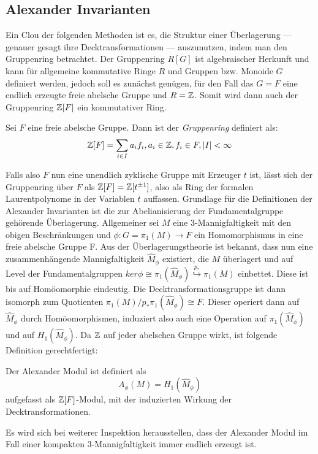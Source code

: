     \subsection{Alexander Invarianten}
    	Ein Clou der folgenden Methoden ist es, die Struktur einer Überlagerung --- genauer gesagt ihre Decktransformationen --- auszunutzen, indem man den Gruppenring betrachtet. Der Gruppenring $R[G]$ ist algebraischer Herkunft und kann für allgemeine kommutative Ringe $R$ und Gruppen bzw. Monoide $G$ definiert werden, jedoch soll es zunächst genügen, für den Fall das $G=F$ eine endlich erzeugte freie abelsche Gruppe und $R=\mathbb{Z}$. Somit wird dann auch der Gruppenring $\mathbb{Z}[F]$ ein kommutativer Ring.
    	\begin{defn}[Gruppenring]
    		Sei $F$ eine freie abelsche Gruppe. Dann ist der \textit{Gruppenring} definiert als:
    		\[
    			\mathbb{Z}[F] = \sum_{i \in I} a_i f_i, a_i \in \mathbb{Z}, f_i \in F, |I| < \infty
    		\]
    	\end{defn}
        \label{wirkung:gruppenring}
    	Falls also $F$ nun eine unendlich zyklische Gruppe mit Erzeuger $t$ ist, lässt sich der Gruppenring über $F$ als $\mathbb{Z}[F] = \mathbb{Z}[t^{\pm 1}]$, also als Ring der formalen Laurentpolynome in der Variablen $t$ auffassen. 
    	Grundlage für die Definitionen der Alexander Invarianten ist die zur Abelianisierung der Fundamentalgruppe gehörende Überlagerung. Allgemeiner sei $M$ eine 3-Mannigfaltigkeit mit den obigen Beschränkungen und $\phi: G=\pi_1(M) \to F$ ein Homomorphismus in eine freie abelsche Gruppe F. Aus der Überlagerungstheorie ist bekannt, dass nun eine zusammenhängende Mannigfaltigkeit $\hat M_\phi$ existiert, die $M$ überlagert und auf Level der Fundamentalgruppen $ker \phi \cong \pi_1 (\hat M_\phi) \stackrel{p_*}{\hookrightarrow} \pi_1(M)$ einbettet. Diese ist bis auf Homöomorphie eindeutig. Die Decktransformationsgruppe ist dann isomorph zum Quotienten $\pi_1(M)/p_*\pi_1(\hat M_\phi) \cong F$. Dieser operiert dann auf $\hat M_\phi$ durch Homöomorphismen, induziert also auch eine Operation auf $\pi_1(\hat M_\phi)$ und auf $H_1(\hat M_\phi)$. Da $\mathbb{Z}$ auf jeder abelschen Gruppe wirkt, ist folgende Definition gerechtfertigt:
    	\begin{defn}
    		Der Alexander Modul ist definiert als
    		\[
    			A_\phi(M) = H_1(\hat M_\phi)
    		\]
    		aufgefasst als $\mathbb{Z}[F]$-Modul, mit der induzierten Wirkung der Decktransformationen.
    	\end{defn}
    	Es wird sich bei weiterer Inspektion herausstellen, dass der Alexander Modul im Fall einer kompakten 3-Mannigfaltigkeit immer endlich erzeugt ist. 
